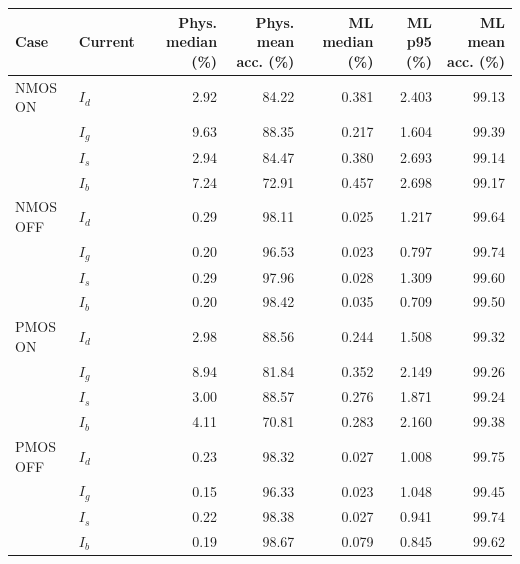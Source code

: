 \begin{tabular}{llrrrrr}
\hline
Case & Current & Phys. median (\%) & Phys. mean acc. (\%) & ML median (\%) & ML p95 (\%) & ML mean acc. (\%) \\
\hline
NMOS ON & $I_{d}$ & 2.92 & 84.22 & 0.381 & 2.403 & 99.13 \\
 & $I_{g}$ & 9.63 & 88.35 & 0.217 & 1.604 & 99.39 \\
 & $I_{s}$ & 2.94 & 84.47 & 0.380 & 2.693 & 99.14 \\
 & $I_{b}$ & 7.24 & 72.91 & 0.457 & 2.698 & 99.17 \\
NMOS OFF & $I_{d}$ & 0.29 & 98.11 & 0.025 & 1.217 & 99.64 \\
 & $I_{g}$ & 0.20 & 96.53 & 0.023 & 0.797 & 99.74 \\
 & $I_{s}$ & 0.29 & 97.96 & 0.028 & 1.309 & 99.60 \\
 & $I_{b}$ & 0.20 & 98.42 & 0.035 & 0.709 & 99.50 \\
PMOS ON & $I_{d}$ & 2.98 & 88.56 & 0.244 & 1.508 & 99.32 \\
 & $I_{g}$ & 8.94 & 81.84 & 0.352 & 2.149 & 99.26 \\
 & $I_{s}$ & 3.00 & 88.57 & 0.276 & 1.871 & 99.24 \\
 & $I_{b}$ & 4.11 & 70.81 & 0.283 & 2.160 & 99.38 \\
PMOS OFF & $I_{d}$ & 0.23 & 98.32 & 0.027 & 1.008 & 99.75 \\
 & $I_{g}$ & 0.15 & 96.33 & 0.023 & 1.048 & 99.45 \\
 & $I_{s}$ & 0.22 & 98.38 & 0.027 & 0.941 & 99.74 \\
 & $I_{b}$ & 0.19 & 98.67 & 0.079 & 0.845 & 99.62 \\
\hline
\end{tabular}
